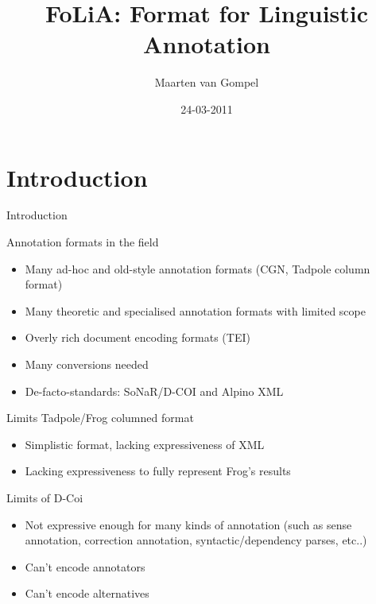 \documentclass[compress]{beamer}
\title{FoLiA: Format for Linguistic Annotation}
\author{Maarten van Gompel}
\date{24-03-2011}
\begin{document}
\begin{frame}
	\titlepage\smallraccoon\ilkuvt
\end{frame}

\section{Introduction}

\begin{frame}{Introduction}

    \begin{block}{Annotation formats in the field}
        \begin{itemize}
            \item Many ad-hoc and old-style annotation formats (CGN, Tadpole column format) 
            \item Many theoretic and specialised annotation formats with limited scope
            \item Overly rich document encoding formats (TEI)
            \item Many conversions needed
            \item De-facto-standards: SoNaR/D-COI and Alpino XML
        \end{itemize}
    \end{block}

\end{frame}
    
\begin{frame}

    \begin{block}{Limits Tadpole/Frog columned format}
        \begin{itemize}
            \item Simplistic format, lacking expressiveness of XML
            \item Lacking expressiveness to fully represent Frog's results
        \end{itemize}
    \end{block}
    
\end{frame}
    
    
\begin{frame}
    \begin{block}{Limits of D-Coi}
        \begin{itemize}
            \item Not expressive enough for many kinds of annotation (such as sense annotation, correction annotation, syntactic/dependency parses, etc..)
            \item Can't encode annotators
            \item Can't encode alternatives
        \end{itemize}
    \end{block}
    
\end{frame}    
\end{document}
